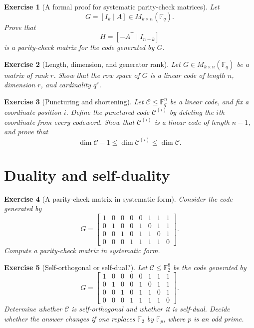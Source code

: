 \documentclass[11pt]{amsbook}
\theoremstyle{exstyle}
\newtheorem{exercise}{Exercise}
\theoremstyle{plain}
\newcommand{\F}{\mathbb{F}}
\newcommand{\Ccal}{\mathcal{C}}
\newcommand{\transpose}{\mathsf{T}}
\begin{document}
\begin{exercise}[A formal proof for systematic parity-check matrices]
Let
\[
G=[I_k\mid A]\in M_{k\times n}(\F_q).
\]
Prove that
\[
H=[-A^{\transpose}\mid I_{n-k}]
\]
is a parity-check matrix for the code generated by $G$.
\end{exercise}

\begin{exercise}[Length, dimension, and generator rank]
Let $G\in M_{k\times n}(\F_q)$ be a matrix of rank $r$. Show that the row space of $G$ is a linear code of length $n$, dimension $r$, and cardinality $q^r$.
\end{exercise}

\begin{exercise}[Puncturing and shortening]
Let $\Ccal\leq\F_q^n$ be a linear code, and fix a coordinate position $i$. Define the punctured code $\Ccal^{(i)}$ by deleting the $i$th coordinate from every codeword. Show that $\Ccal^{(i)}$ is a linear code of length $n-1$, and prove that
\[
\dim \Ccal -1 \leq \dim \Ccal^{(i)} \leq \dim \Ccal.
\]
\end{exercise}

\section{Duality and self-duality}

\begin{exercise}[A parity-check matrix in systematic form]
Consider the code generated by
\[
G=
\begin{bmatrix}
1&0&0&0&0&1&1&1\\
0&1&0&0&1&0&1&1\\
0&0&1&0&1&1&0&1\\
0&0&0&1&1&1&1&0
\end{bmatrix}.
\]
Compute a parity-check matrix in systematic form.
\end{exercise}

\begin{exercise}[Self-orthogonal or self-dual?]
Let $\Ccal\leq \F_2^8$ be the code generated by
\[
G=
\begin{bmatrix}
1&0&0&0&0&1&1&1\\
0&1&0&0&1&0&1&1\\
0&0&1&0&1&1&0&1\\
0&0&0&1&1&1&1&0
\end{bmatrix}.
\]
Determine whether $\Ccal$ is self-orthogonal and whether it is self-dual. Decide whether the answer changes if one replaces $\F_2$ by $\F_p$, where $p$ is an odd prime.
\end{exercise}
\end{document}
